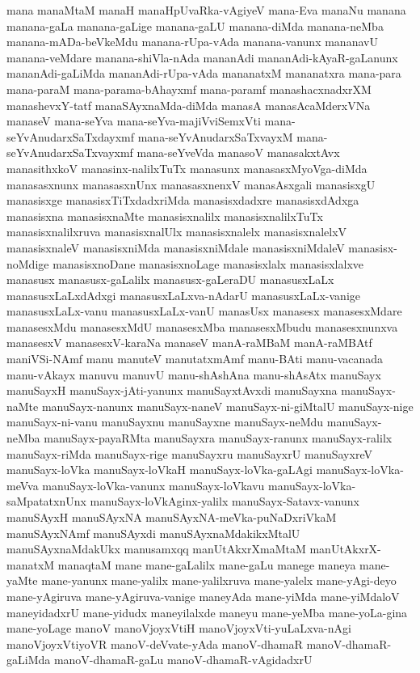 {mana
manaMtaM
manaH
manaHpUvaRka-vAgiyeV
mana-Eva
manaNu
manana
manana-gaLa
manana-gaLige
manana-gaLU
manana-diMda
manana-neMba
manana-mADa-beVkeMdu
manana-rUpa-vAda
manana-vanunx
mananavU
manana-veMdare
manana-shiVla-nAda
mananAdi
mananAdi-kAyaR-gaLanunx
mananAdi-gaLiMda
mananAdi-rUpa-vAda
mananatxM
mananatxra
mana-para
mana-paraM
mana-parama-bAhayxmf
mana-paramf
manashacxnadxrXM
manashevxY-tatf
manaSAyxnaMda-diMda
manasA
manasAcaMderxVNa
manaseV
mana-seYva
mana-seYva-majiVviSemxVti
mana-seYvAnudarxSaTxdayxmf
mana-seYvAnudarxSaTxvayxM
mana-seYvAnudarxSaTxvayxmf
mana-seYveVda
manasoV
manasakxtAvx
manasithxkoV
manasinx-nalilxTuTx
manasunx
manasasxMyoVga-diMda
manasasxnunx
manasasxnUnx
manasasxnenxV
manasAsxgali
manasisxgU
manasisxge
manasisxTiTxdadxriMda
manasisxdadxre
manasisxdAdxga
manasisxna
manasisxnaMte
manasisxnalilx
manasisxnalilxTuTx
manasisxnalilxruva
manasisxnalUlx
manasisxnalelx
manasisxnalelxV
manasisxnaleV
manasisxniMda
manasisxniMdale
manasisxniMdaleV
manasisx-noMdige
manasisxnoDane
manasisxnoLage
manasisxlalx
manasisxlalxve
manasusx
manasusx-gaLalilx
manasusx-gaLeraDU
manasusxLaLx
manasusxLaLxdAdxgi
manasusxLaLxva-nAdarU
manasusxLaLx-vanige
manasusxLaLx-vanu
manasusxLaLx-vanU
manasUsx
manasesx
manasesxMdare
manasesxMdu
manasesxMdU
manasesxMba
manasesxMbudu
manasesxnunxva
manasesxV
manasesxV-karaNa
manaseV
manA-raMBaM
manA-raMBAtf
maniVSi-NAmf
manu
manuteV
manutatxmAmf
manu-BAti
manu-vacanada
manu-vAkayx
manuvu
manuvU
manu-shAshAna
manu-shAsAtx
manuSayx
manuSayxH
manuSayx-jAti-yanunx
manuSayxtAvxdi
manuSayxna
manuSayx-naMte
manuSayx-nanunx
manuSayx-naneV
manuSayx-ni-giMtalU
manuSayx-nige
manuSayx-ni-vanu
manuSayxnu
manuSayxne
manuSayx-neMdu
manuSayx-neMba
manuSayx-payaRMta
manuSayxra
manuSayx-ranunx
manuSayx-ralilx
manuSayx-riMda
manuSayx-rige
manuSayxru
manuSayxrU
manuSayxreV
manuSayx-loVka
manuSayx-loVkaH
manuSayx-loVka-gaLAgi
manuSayx-loVka-meVva
manuSayx-loVka-vanunx
manuSayx-loVkavu
manuSayx-loVka-saMpatatxnUnx
manuSayx-loVkAginx-yalilx
manuSayx-Satavx-vanunx
manuSAyxH
manuSAyxNA
manuSAyxNA-meVka-puNaDxriVkaM
manuSAyxNAmf
manuSAyxdi
manuSAyxnaMdakikxMtalU
manuSAyxnaMdakUkx
manusamxqq
manUtAkxrXmaMtaM
manUtAkxrX-manatxM
manaqtaM
mane
mane-gaLalilx
mane-gaLu
manege
maneya
mane-yaMte
mane-yanunx
mane-yalilx
mane-yalilxruva
mane-yalelx
mane-yAgi-deyo
mane-yAgiruva
mane-yAgiruva-vanige
maneyAda
mane-yiMda
mane-yiMdaloV
maneyidadxrU
mane-yidudx
maneyilalxde
maneyu
mane-yeMba
mane-yoLa-gina
mane-yoLage
manoV
manoVjoyxVtiH
manoVjoyxVti-yuLaLxva-nAgi
manoVjoyxVtiyoVR
manoV-deVvate-yAda
manoV-dhamaR
manoV-dhamaR-gaLiMda
manoV-dhamaR-gaLu
manoV-dhamaR-vAgidadxrU
}
